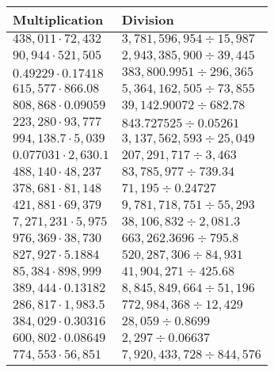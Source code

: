 \begin{longtable}[]{@{}ll@{}}
\toprule
Multiplication & Division\tabularnewline
\midrule
\endhead
\(438,011\cdot72,432\) & \(3,781,596,954÷15,987\)\tabularnewline
\(90,944\cdot521,505\) & \(2,943,385,900÷39,445\)\tabularnewline
\(0.49229\cdot0.17418\) & \(383,800.9951÷296,365\)\tabularnewline
\(615,577\cdot866.08\) & \(5,364,162,505÷73,855\)\tabularnewline
\(808,868\cdot0.09059\) & \(39,142.90072÷682.78\)\tabularnewline
\(223,280\cdot93,777\) & \(843.727525÷0.05261\)\tabularnewline
\(994,138.7\cdot5,039\) & \(3,137,562,593÷25,049\)\tabularnewline
\(0.077031\cdot2,630.1\) & \(207,291,717÷3,463\)\tabularnewline
\(488,140\cdot48,237\) & \(83,785,977÷739.34\)\tabularnewline
\(378,681\cdot81,148\) & \(71,195÷0.24727\)\tabularnewline
\(421,881\cdot69,379\) & \(9,781,718,751÷55,293\)\tabularnewline
\(7,271,231\cdot5,975\) & \(38,106,832÷2,081.3\)\tabularnewline
\(976,369\cdot38,730\) & \(663,262.3696 ÷795.8\)\tabularnewline
\(827,927\cdot5.1884\) & \(520,287,306÷84,931\)\tabularnewline
\(85,384\cdot898,999\) & \(41,904,271÷425.68\)\tabularnewline
\(389,444\cdot0.13182\) & \(8,845,849,664÷51,196\)\tabularnewline
\(286,817\cdot1,983.5\) & \(772,984,368÷12,429\)\tabularnewline
\(384,029\cdot0.30316\) & \(28,059÷0.8699\)\tabularnewline
\(600,802\cdot0.08649\) & \(2,297÷0.06637\)\tabularnewline
\(774,553\cdot56,851\) & \(7,920,433,728÷844,576\)\tabularnewline
\bottomrule
\end{longtable}
